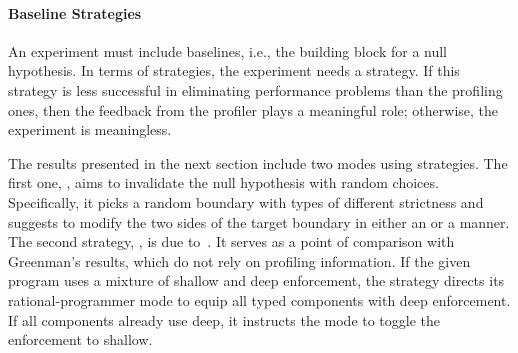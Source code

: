 \paragraph{Baseline Strategies} An experiment must include baselines, i.e., the
 building block for a null hypothesis. In terms of strategies, the experiment
 needs a \agnostickw{} strategy.  If this \agnostickw{} strategy is less
 successful in eliminating performance problems than the profiling ones, then
 the feedback from the profiler plays a meaningful role; otherwise, the
 experiment is meaningless.

The results presented in the next section include two modes using
 \agnostickw{} strategies. The first one, \randkw{}, aims to invalidate the null
 hypothesis with random choices. Specifically, it picks a random boundary with
 types of different strictness and suggests to modify the two sides of the
 target boundary in either an \optkw{} or a \conkw{} manner.  The second
 \agnostickw{} strategy, \togglekw{}, is due to~\citet{g-deep-shallow}. It
 serves as a point of comparison with Greenman's results, which do not rely on
 profiling information. If the given program uses a mixture of shallow and deep
 enforcement, the strategy directs its rational-programmer mode to equip all
 typed components with deep enforcement. If all components already use deep, it
 instructs the mode to toggle the enforcement to shallow.
